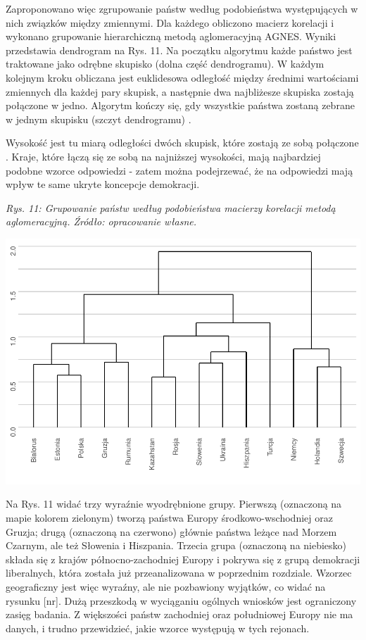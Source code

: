 \documentclass[12pt]{article}
\begin{document}
Zaproponowano więc zgrupowanie państw według podobieństwa występujących w nich związków między zmiennymi. Dla każdego obliczono macierz korelacji i wykonano grupowanie hierarchiczną metodą aglomeracyjną AGNES. Wyniki przedstawia dendrogram na Rys. 11. Na początku algorytmu każde państwo jest traktowane jako odrębne skupisko (dolna część dendrogramu). W każdym kolejnym kroku obliczana jest euklidesowa odległość między średnimi wartościami zmiennych dla każdej pary skupisk, a następnie dwa najbliżesze skupiska zostają połączone w jedno. Algorytm kończy się, gdy wszystkie państwa zostaną zebrane w jednym skupisku (szczyt dendrogramu) \citep{Struyf}.

Wysokość jest tu miarą odległości dwóch skupisk, które zostają ze sobą połączone \citep{MaechRouss}. Kraje, które łączą się ze sobą na najniższej wysokości, mają najbardziej podobne wzorce odpowiedzi - zatem można podejrzewać, że na odpowiedzi mają wpływ te same ukryte koncepcje demokracji.

\emph{Rys. 11: Grupowanie państw według podobieństwa macierzy korelacji metodą aglomeracyjną. Źródło: opracowanie własne.}

\begin{center}\includegraphics{text_ASA_files/figure-latex/dendrogram-1} \end{center}

Na Rys. 11 widać trzy wyraźnie wyodrębnione grupy. Pierwszą (oznaczoną na mapie kolorem zielonym) tworzą państwa Europy środkowo-wschodniej oraz Gruzja; drugą (oznaczoną na czerwono) głównie państwa leżące nad Morzem Czarnym, ale też Słowenia i Hiszpania. Trzecia grupa (oznaczoną na niebiesko) składa się z krajów północno-zachodniej Europy i pokrywa się z grupą demokracji liberalnych, która została już przeanalizowana w poprzednim rozdziale. Wzorzec geograficzny jest więc wyraźny, ale nie pozbawiony wyjątków, co widać na rysunku {[}nr{]}. Dużą przeszkodą w wyciąganiu ogólnych wniosków jest ograniczony zasięg badania. Z większości państw zachodniej oraz południowej Europy nie ma danych, i trudno przewidzieć, jakie wzorce występują w tych rejonach.
\end{document}
